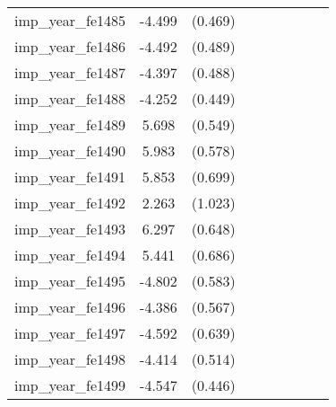 {\begin{tabular}{l*{4}{cc}}
imp\_year\_fe1485&   -4.499\sym{***}&  (0.469)&                  &         &                  &         &                  &         \\
imp\_year\_fe1486&   -4.492\sym{***}&  (0.489)&                  &         &                  &         &                  &         \\
imp\_year\_fe1487&   -4.397\sym{***}&  (0.488)&                  &         &                  &         &                  &         \\
imp\_year\_fe1488&   -4.252\sym{***}&  (0.449)&                  &         &                  &         &                  &         \\
imp\_year\_fe1489&    5.698\sym{***}&  (0.549)&                  &         &                  &         &                  &         \\
imp\_year\_fe1490&    5.983\sym{***}&  (0.578)&                  &         &                  &         &                  &         \\
imp\_year\_fe1491&    5.853\sym{***}&  (0.699)&                  &         &                  &         &                  &         \\
imp\_year\_fe1492&    2.263\sym{*}  &  (1.023)&                  &         &                  &         &                  &         \\
imp\_year\_fe1493&    6.297\sym{***}&  (0.648)&                  &         &                  &         &                  &         \\
imp\_year\_fe1494&    5.441\sym{***}&  (0.686)&                  &         &                  &         &                  &         \\
imp\_year\_fe1495&   -4.802\sym{***}&  (0.583)&                  &         &                  &         &                  &         \\
imp\_year\_fe1496&   -4.386\sym{***}&  (0.567)&                  &         &                  &         &                  &         \\
imp\_year\_fe1497&   -4.592\sym{***}&  (0.639)&                  &         &                  &         &                  &         \\
imp\_year\_fe1498&   -4.414\sym{***}&  (0.514)&                  &         &                  &         &                  &         \\
imp\_year\_fe1499&   -4.547\sym{***}&  (0.446)&                  &         &                  &         &                  &         \\

\end{tabular}}
